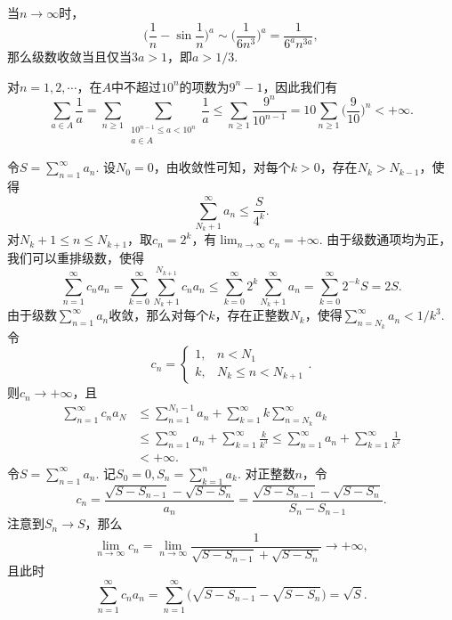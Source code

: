\begin{ans}
  当$n\to\infty$时，
  \[ \Big(\frac1n-\sin\frac1n\Big)^a\sim
  \Big( \frac1{6n^3} \Big)^a=\frac1{6^an^{3a}}, \]
  那么级数收敛当且仅当$3a>1$，即$a>1/3$.
\end{ans}

\begin{ans}
  对$n=1,2,\cdots$，在$A$中不超过$10^n$的项数为$9^n-1$，因此我们有
  \[
    \sum_{a\in A}\frac1a=\sum_{n\ge1}
    \sum_{\substack{10^{n-1}\le a<10^n\\a\in A}}\frac1a
    \le \sum_{n\ge1}\frac{9^n}{10^{n-1}}
    =10\sum_{n\ge1}\Big( \frac9{10} \Big)^n < +\infty.
  \]
\end{ans}

\begin{ans}
  \method 令$S=\sum_{n=1}^\infty a_n$. 设$N_0=0$，由收敛性可知，对每个$k>0$，存在$N_k>N_{k-1}$，使得
  \[ \sum_{N_k+1}^\infty a_n\le\frac S{4^k}. \]
  对$N_k+1\le n\le N_{k+1}$，取$c_n=2^k$，有$\lim_{n\to\infty}c_n=+\infty$.
  由于级数通项均为正，我们可以重排级数，使得
  \[
    \sum_{n=1}^\infty c_na_n = \sum_{k=0}^\infty
    \sum_{N_k+1}^{N_{k+1}}c_na_n \le \sum_{k=0}^\infty
    2^k\sum_{N_k+1}^\infty a_n = \sum_{k=0}^\infty 2^{-k}S
    =2S.
  \]
  \method 由于级数$\sum_{n=1}^\infty a_n$收敛，那么对每个$k$，存在正整数$N_k$，使得$\sum_{n=N_k}^\infty a_n<1/k^3$. 令
  \[
    c_n=\begin{cases}
      1, & n<N_1\\
      k, & N_k\le n<N_{k+1}
    \end{cases}.
  \]
  则$c_n\to+\infty$，且
  \begin{align*}
    \sum_{n=1}^\infty c_na_N & \le \sum_{n=1}^{N_1-1}a_n
    + \sum_{k=1}^\infty k\sum_{n=N_k}^\infty a_k\\
    & \le \sum_{n=1}^\infty a_n +\sum_{k=1}^\infty \frac k{k^3} \le \sum_{n=1}^\infty a_n +\sum_{k=1}^\infty\frac1{k^2}\\
    & < +\infty.
  \end{align*}
  \method 令$S=\sum_{n=1}^\infty a_n$. 记$S_0=0,S_n=\sum_{k=1}^n a_k$. 对正整数$n$，令
  \[
    c_n = \frac{\sqrt{S-S_{n-1}}-\sqrt{S-S_n}}{a_n}
    =\frac{\sqrt{S-S_{n-1}}-\sqrt{S-S_n}}{S_n-S_{n-1}}.
  \]
  注意到$S_n\to S$，那么
  \[
    \lim_{n\to\infty} c_n = \lim _{n\to\infty}
    \frac{1}{\sqrt{S-S_{n-1}}+\sqrt{S-S_n}} \to +\infty,
  \]
  且此时
  \[
    \sum_{n=1}^\infty c_na_n = \sum_{n=1}^\infty
    \Big(\sqrt{S-S_{n-1}}-\sqrt{S-S_n}\Big)
    = \sqrt S.
  \]
\end{ans}

